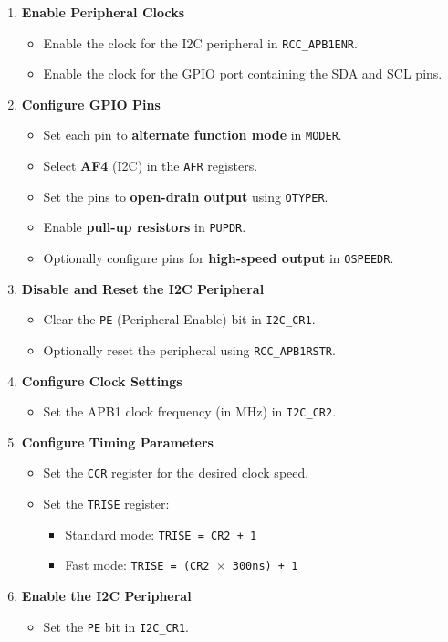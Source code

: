\documentclass[12pt]{article}
\begin{document}
\begin{enumerate}[label=\textbf{Step \arabic*:}, leftmargin=2.5em]
  \item \textbf{Enable Peripheral Clocks}
  \begin{itemize}
    \item Enable the clock for the I2C peripheral in \texttt{RCC\_APB1ENR}.
    \item Enable the clock for the GPIO port containing the SDA and SCL pins.
  \end{itemize}

  \item \textbf{Configure GPIO Pins}
  \begin{itemize}
    \item Set each pin to \textbf{alternate function mode} in \texttt{MODER}.
    \item Select \textbf{AF4} (I2C) in the \texttt{AFR} registers.
    \item Set the pins to \textbf{open-drain output} using \texttt{OTYPER}.
    \item Enable \textbf{pull-up resistors} in \texttt{PUPDR}.
    \item Optionally configure pins for \textbf{high-speed output} in \texttt{OSPEEDR}.
  \end{itemize}

  \item \textbf{Disable and Reset the I2C Peripheral}
  \begin{itemize}
    \item Clear the \texttt{PE} (Peripheral Enable) bit in \texttt{I2C\_CR1}.
    \item Optionally reset the peripheral using \texttt{RCC\_APB1RSTR}.
  \end{itemize}

  \item \textbf{Configure Clock Settings}
  \begin{itemize}
    \item Set the APB1 clock frequency (in MHz) in \texttt{I2C\_CR2}.
  \end{itemize}

  \item \textbf{Configure Timing Parameters}
  \begin{itemize}
    \item Set the \texttt{CCR} register for the desired clock speed.
    \item Set the \texttt{TRISE} register:
    \begin{itemize}
      \item Standard mode: \texttt{TRISE = CR2 + 1}
      \item Fast mode: \texttt{TRISE = (CR2 $\times$ 300ns) + 1}
    \end{itemize}
  \end{itemize}

  \item \textbf{Enable the I2C Peripheral}
  \begin{itemize}
    \item Set the \texttt{PE} bit in \texttt{I2C\_CR1}.
  \end{itemize}
\end{enumerate}
\end{document}
